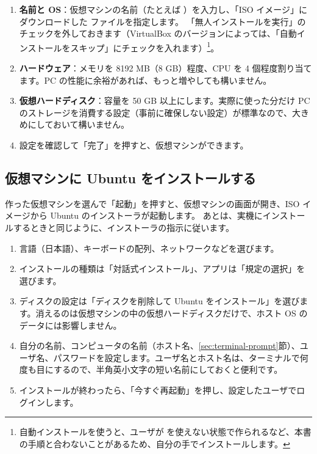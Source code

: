 \begin{enumerate}
  \item \textbf{名前と OS}：仮想マシンの名前（たとえば ）を入力し、「ISO イメージ」にダウンロードした  ファイルを指定します。
    「無人インストールを実行」のチェックを外しておきます（VirtualBox のバージョンによっては、「自動インストールをスキップ」にチェックを入れます）\footnote{自動インストールを使うと、ユーザが  を使えない状態で作られるなど、本書の手順と合わないことがあるため、自分の手でインストールします。}。
  \item \textbf{ハードウェア}：メモリを 8192 MB（8 GB）程度、CPU を 4 個程度割り当てます。PC の性能に余裕があれば、もっと増やしても構いません。
  \item \textbf{仮想ハードディスク}：容量を 50 GB 以上にします。実際に使った分だけ PC のストレージを消費する設定（事前に確保しない設定）が標準なので、大きめにしておいて構いません。
  \item 設定を確認して「完了」を押すと、仮想マシンができます。
\end{enumerate}

\subsection{仮想マシンに Ubuntu をインストールする}

作った仮想マシンを選んで「起動」を押すと、仮想マシンの画面が開き、ISO イメージから Ubuntu のインストーラが起動します。
あとは、実機にインストールするときと同じように、インストーラの指示に従います。

\begin{enumerate}
  \item 言語（日本語）、キーボードの配列、ネットワークなどを選びます。
  \item インストールの種類は「対話式インストール」、アプリは「規定の選択」を選びます。
  \item ディスクの設定は「ディスクを削除して Ubuntu をインストール」を選びます。消えるのは仮想マシンの中の仮想ハードディスクだけで、ホスト OS のデータには影響しません。
  \item 自分の名前、コンピュータの名前（ホスト名、\ref{sec:terminal-prompt}節）、ユーザ名、パスワードを設定します。ユーザ名とホスト名は、ターミナルで何度も目にするので、半角英小文字の短い名前にしておくと便利です。
  \item インストールが終わったら、「今すぐ再起動」を押し、設定したユーザでログインします。
\end{enumerate}

